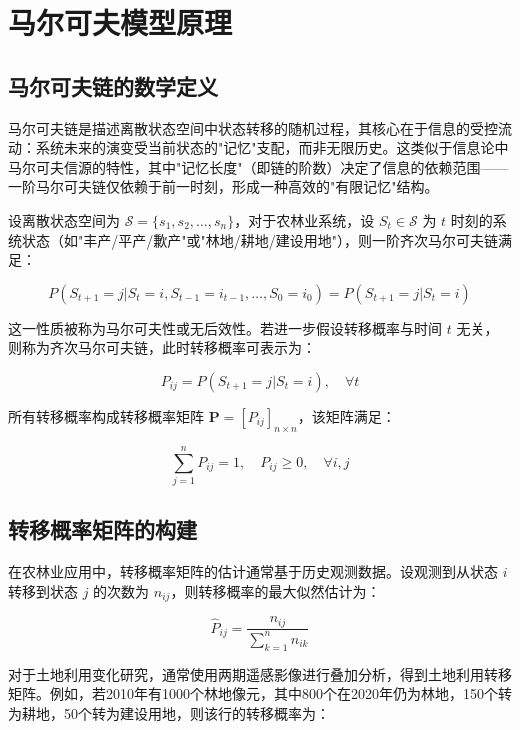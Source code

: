 \documentclass[a4paper,12pt]{ctexart}
\begin{document}
\section{马尔可夫模型原理}

\subsection{马尔可夫链的数学定义}

马尔可夫链是描述离散状态空间中状态转移的随机过程，其核心在于信息的受控流动：系统未来的演变受当前状态的"记忆"支配，而非无限历史。这类似于信息论中马尔可夫信源的特性，其中"记忆长度"（即链的阶数）决定了信息的依赖范围——一阶马尔可夫链仅依赖于前一时刻，形成一种高效的"有限记忆"结构。

设离散状态空间为 $\mathcal{S} = \{s_1, s_2, \ldots, s_n\}$，对于农林业系统，设 $S_t \in \mathcal{S}$ 为 $t$ 时刻的系统状态（如"丰产/平产/歉产"或"林地/耕地/建设用地"），则一阶齐次马尔可夫链满足：

\begin{equation}
    P(S_{t+1} = j | S_t = i, S_{t-1} = i_{t-1}, \ldots, S_0 = i_0) = P(S_{t+1} = j | S_t = i)
\end{equation}

这一性质被称为马尔可夫性或无后效性。若进一步假设转移概率与时间 $t$ 无关，则称为齐次马尔可夫链，此时转移概率可表示为：

\begin{equation}
    P_{ij} = P(S_{t+1} = j | S_t = i), \quad \forall t
\end{equation}

所有转移概率构成转移概率矩阵 $\mathbf{P} = [P_{ij}]_{n \times n}$，该矩阵满足：

\begin{equation}
    \sum_{j=1}^{n} P_{ij} = 1, \quad P_{ij} \geq 0, \quad \forall i, j
\end{equation}

\subsection{转移概率矩阵的构建}

在农林业应用中，转移概率矩阵的估计通常基于历史观测数据。设观测到从状态 $i$ 转移到状态 $j$ 的次数为 $n_{ij}$，则转移概率的最大似然估计为：

\begin{equation}
    \hat{P}_{ij} = \frac{n_{ij}}{\sum_{k=1}^{n} n_{ik}}
\end{equation}

对于土地利用变化研究，通常使用两期遥感影像进行叠加分析，得到土地利用转移矩阵。例如，若2010年有1000个林地像元，其中800个在2020年仍为林地，150个转为耕地，50个转为建设用地，则该行的转移概率为：
\end{document}
